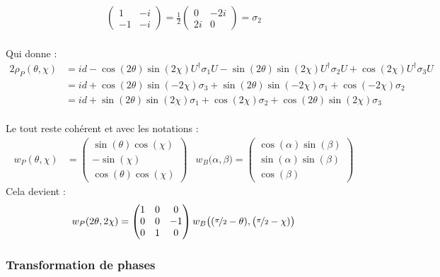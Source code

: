 \begin{annexe}
\begin{align*}
\begin{pmatrix}
		1 & -i \\ -1 & -i
	\end{pmatrix} = \frac{1}{2} \begin{pmatrix} 
		0 & -2i \\ 2i & 0
	\end{pmatrix} = \sigma_2
\end{align*}
\\
Qui donne :
\begin{align*}
	2\rho_P(\theta, \chi) &= id - \cos(2\theta) \sin(2\chi) U^\dagger \sigma_1 U - \sin(2\theta) \sin(2\chi) U^\dagger \sigma_2 U + \cos (2\chi) U^\dagger \sigma_3 U \\
	&= id + \cos(2\theta) \sin(-2\chi) \sigma_3 + \sin(2\theta) \sin(-2\chi)  \sigma_1 + \cos (-2\chi) \sigma_2 \\
	&= id + \sin(2\theta) \sin(2\chi)  \sigma_1 + \cos (2\chi) \sigma_2 + \cos(2\theta) \sin(2\chi) \sigma_3
\end{align*}
\\ 
Le tout reste cohérent et avec les notations :
\begin{align*}
	w_P(\theta, \chi) &= \begin{pmatrix}
		\sin(\theta) \cos(\chi) \\ -\sin (\chi) \\ \cos(\theta) \cos(\chi)
	\end{pmatrix}  &   w_B\big( \alpha, \beta \big) = \begin{pmatrix}
		\cos(\alpha) \sin(\beta) \\ \sin(\alpha) \sin(\beta) \\ \cos (\beta)
	\end{pmatrix}
\end{align*}
Cela devient :
\[w_P(2\theta, 2\chi) = \begin{pmatrix}
	1 & 0 & 0 \\ 0 & 0 & -1 \\ 0 & 1 & 0
\end{pmatrix} w_B\big( (\nicefrac{\pi}{2}-\theta ), \big(\nicefrac{\pi}{2}-\chi) \big)\]
\skipl 



\subsubsection{Transformation de phases}


\end{annexe}
